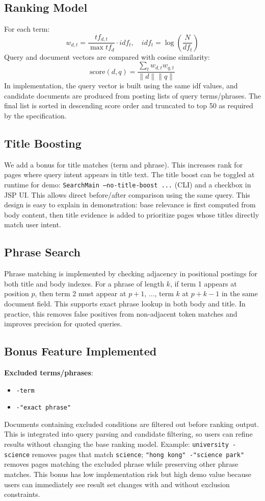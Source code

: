 \documentclass[11pt,a4paper]{article}
\begin{document}
\subsection{Ranking Model}
For each term:
\[
  w_{d,t} = \frac{tf_{d,t}}{\max tf_d} \cdot idf_t,
  \quad
  idf_t = \log\left(\frac{N}{df_t}\right)
\]
Query and document vectors are compared with cosine similarity:
\[
  \text{score}(d,q)=\frac{\sum_t w_{d,t}w_{q,t}}
  {\|d\|\|q\|}
\]
In implementation, the query vector is built using the same idf values, and candidate
documents are produced from posting lists of query terms/phrases. The final list is sorted
in descending score order and truncated to top 50 as required by the specification.

\subsection{Title Boosting}
We add a bonus for title matches (term and phrase). This increases rank for pages where
query intent appears in title text. The title boost can be toggled at runtime for demo:
\texttt{SearchMain --no-title-boost ...} (CLI) and a checkbox in JSP UI. This allows direct
before/after comparison using the same query.
This design is easy to explain in demonstration: base relevance is first computed from body
content, then title evidence is added to prioritize pages whose titles directly match user intent.

\subsection{Phrase Search}
Phrase matching is implemented by checking adjacency in positional postings for both title
and body indexes. For a phrase of length $k$, if term 1 appears at position $p$, then term 2
must appear at $p+1$, ..., term $k$ at $p+k-1$ in the same document field. This supports
exact phrase lookup in both body and title.
In practice, this removes false positives from non-adjacent token matches and improves precision
for quoted queries.

\subsection{Bonus Feature Implemented}
\textbf{Excluded terms/phrases}:
\begin{itemize}[leftmargin=1.5em]
  \item \texttt{-term}
  \item \texttt{-"exact phrase"}
\end{itemize}
Documents containing excluded conditions are filtered out before ranking output. This is
integrated into query parsing and candidate filtering, so users can refine results without
changing the base ranking model. Example: \texttt{university -science} removes pages that
match \texttt{science}; \texttt{"hong kong" -"science park"} removes pages matching the
excluded phrase while preserving other phrase matches.
This bonus has low implementation risk but high demo value because users can immediately see
result set changes with and without exclusion constraints.
\end{document}
